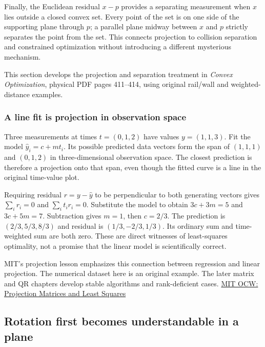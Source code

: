 Finally, the Euclidean residual \(x-p\) provides a separating measurement when \(x\) lies outside a closed convex set. Every point of the set is on one side of the supporting plane through \(p\); a parallel plane midway between \(x\) and \(p\) strictly separates the point from the set. This connects projection to collision separation and constrained optimization without introducing a different mysterious mechanism.

This section develops the projection and separation treatment in \emph{Convex Optimization}, physical PDF pages 411--414, using original rail/wall and weighted-distance examples.

\subsubsection{A line fit is projection in observation space}\label{01-foundations-i-ch017-a-line-fit-is-projection-in-observation-space}

\hypertarget{01-foundations-i-ch017-a-line-fit-is-projection-in-observation-space}{}

Three measurements at times \(t=(0,1,2)\) have values \(y=(1,1,3)\). Fit the model \(\widehat y_i=c+mt_i\). Its possible predicted data vectors form the span of \((1,1,1)\) and \((0,1,2)\) in three-dimensional observation space. The closest prediction is therefore a projection onto that span, even though the fitted curve is a line in the original time-value plot.

Requiring residual \(r=y-\widehat y\) to be perpendicular to both generating vectors gives \(\sum_i r_i=0\) and \(\sum_i t_ir_i=0\). Substitute the model to obtain \(3c+3m=5\) and \(3c+5m=7\). Subtraction gives \(m=1\), then \(c=2/3\). The prediction is \((2/3,5/3,8/3)\) and residual is \((1/3,-2/3,1/3)\). Its ordinary sum and time-weighted sum are both zero. These are direct witnesses of least-squares optimality, not a promise that the linear model is scientifically correct.

MIT's projection lesson emphasizes this connection between regression and linear projection. The numerical dataset here is an original example. The later matrix and QR chapters develop stable algorithms and rank-deficient cases. \href{https://www.ocw.mit.edu/courses/18-06sc-linear-algebra-fall-2011/pages/least-squares-determinants-and-eigenvalues/projection-matrices-and-least-squares/}{MIT OCW: Projection Matrices and Least Squares}

\subsection{Rotation first becomes understandable in a plane}\label{01-foundations-i-ch017-rotation-first-becomes-understandable-in-a-plane}


